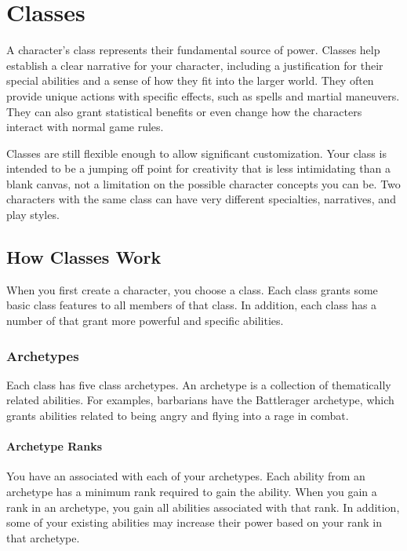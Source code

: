\chapter{Classes}\label{Classes}

    A character's class represents their fundamental source of power.
    Classes help establish a clear narrative for your character, including a justification for their special abilities and a sense of how they fit into the larger world.
    They often provide unique actions with specific effects, such as spells and martial maneuvers.
    They can also grant statistical benefits or even change how the characters interact with normal game rules.

    Classes are still flexible enough to allow significant customization.
    Your class is intended to be a jumping off point for creativity that is less intimidating than a blank canvas, not a limitation on the possible character concepts you can be.
    Two characters with the same class can have very different specialties, narratives, and play styles.

\section{How Classes Work}
    When you first create a character, you choose a class.
    Each class grants some basic class features to all members of that class.
    In addition, each class has a number of  that grant more powerful and specific abilities.

    \subsection{Archetypes}\label{Archetypes}
        Each class has five class archetypes.
        An archetype is a collection of thematically related abilities.
        For examples, barbarians have the Battlerager archetype, which grants abilities related to being angry and flying into a rage in combat.

        \subsubsection{Archetype Ranks}\label{Archetype Ranks}
            You have an  associated with each of your archetypes.
            Each ability from an archetype has a minimum rank required to gain the ability.
            When you gain a rank in an archetype, you gain all abilities associated with that rank.
            In addition, some of your existing abilities may increase their power based on your rank in that archetype.

